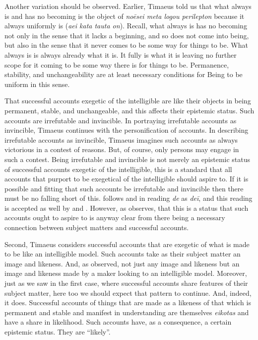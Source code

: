 Another variation should be observed. Earlier, Timaeus told us that what always is and has no becoming is the object of \emph{noēsei meta logou perilepton} because it always uniformly is (\emph{aei kata tauta on}). Recall, what always is has no becoming not only in the sense that it lacks a beginning, and so does not come into being, but also in the sense that it never comes to be some way for things to be. What always is is always already what it is. It fully is what it is leaving no further scope for it coming to be some way there is for things to be. Permanence, stability, and unchangeability are at least necessary conditions for Being to be uniform in this sense.

That successful accounts exegetic of the intelligible are like their objects in being permanent, stable, and unchangeable, and this affects their epistemic status. Such accounts are irrefutable and invincible. In portraying irrefutable accounts as invincible, Timaeus continues with the personification of accounts. In describing irrefutable accounts as invincible, Timaeus imagines such accounts as always victorious in a contest of reasons. But, of course, only persons may engage in such a contest. Being irrefutable and invincible is not merely an epistemic status of successful accounts exegetic of the intelligible, this is a standard that all accounts that purport to be exegetical of the intelligible should aspire to. If it is possible and fitting that such accounts be irrefutable and invincible then there must be no falling short of this. \citet[150]{Burnyeat:2005it} follows \citet[88]{Archer-Hind:1888qd} and \citet{Burnet:1905oq} in reading \emph{de} as \emph{deī}, and this reading is accepted as well by \citet[74]{Taylor:1928qb} and \citet[52]{Bury:1929jb}. However, as \citet[121 n22]{Bryan:2012bt} observes, that this is a status that such accounts ought to aspire to is anyway clear from there being a necessary connection between subject matters and successful accounts. 

Second, Timaeus considers successful accounts that are exegetic of what is made to be like an intelligible model. Such accounts take as their subject matter an image and likeness. And, as \citet[]{Betegh:2010aa} observed, not just any image and likeness but an image and likeness made by a maker looking to an intelligible model. Moreover, just as we saw in the first case, where successful accounts share features of their subject matter, here too we should expect that pattern to continue. And, indeed, it does. Successful accounts of things that are made as a likeness of that which is permanent and stable and manifest in understanding are themselves \emph{eikotas} and have a share in likelihood. Such accounts have, as a consequence, a certain epistemic status. They are ``likely''. 

